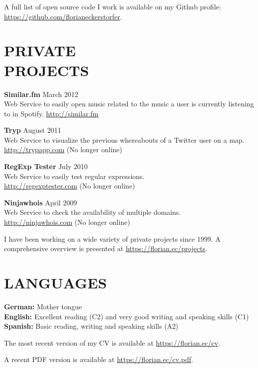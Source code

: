 \documentclass[margin]{res}
\begin{document}
\begin{resume}
A full list of open source code I work is available on my Github profile: \url{https://github.com/florianeckerstorfer}.

\section{PRIVATE \\ PROJECTS}

\textbf{Similar.fm} \hfill March 2012 \\
	Web Service to easily open music related to the music a user is currently listening to in Spotify. \url{http://similar.fm}

\textbf{Tryp} \hfill August 2011 \\
	Web Service to visualize the previous whereabouts of a Twitter user on a map. \\ \url{http://trypapp.com} (No longer online)

\textbf{RegExp Tester} \hfill July 2010 \\
	Web Service to easily test regular expressions. \\ \url{http://regexptester.com} (No longer online)

\textbf{Ninjawhois} \hfill April 2009 \\
	Web Service to check the availability of multiple domains. \\ \url{http://ninjawhois.com} (No longer online)

I have been working on a wide variety of private projects since 1999. A comprehensive overview is presented at \url{https://florian.ec/projects}.


\section{LANGUAGES}

\textbf{German:} Mother tongue \\
\textbf{English:} Excellent reading (C2) and very good writing and speaking skills (C1) \\
\textbf{Spanish:} Basic reading, writing and speaking skills (A2)


\end{resume}

\vspace{15 mm}

The most recent version of my CV is available at \url{https://florian.ec/cv}.

A recent PDF version is available at \url{https://florian.ec/cv.pdf}.
\end{document}
